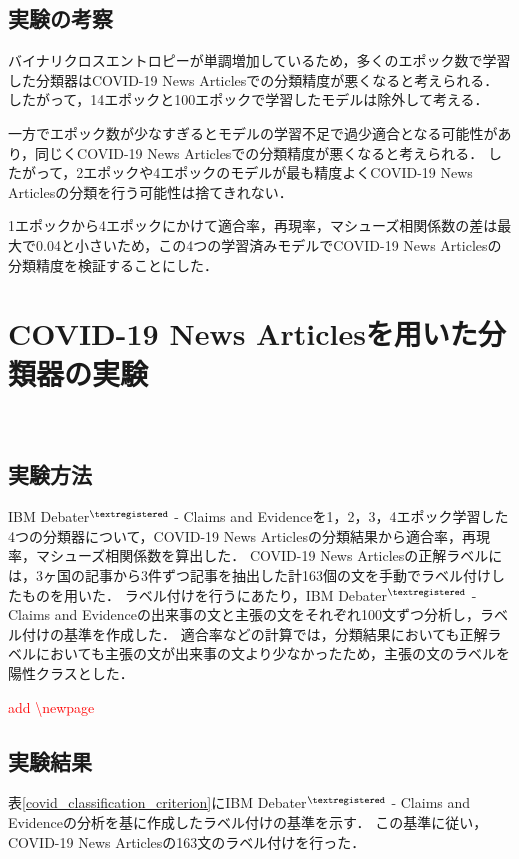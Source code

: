 \documentclass[12pt,a4j]{jreport}
\begin{document}
\subsection{実験の考察}
バイナリクロスエントロピーが単調増加しているため，多くのエポック数で学習した分類器はCOVID-19 News Articlesでの分類精度が悪くなると考えられる．
したがって，14エポックと100エポックで学習したモデルは除外して考える．

一方でエポック数が少なすぎるとモデルの学習不足で過少適合となる可能性があり，同じくCOVID-19 News Articlesでの分類精度が悪くなると考えられる．
したがって，2エポックや4エポックのモデルが最も精度よくCOVID-19 News Articlesの分類を行う可能性は捨てきれない．

1エポックから4エポックにかけて適合率，再現率，マシューズ相関係数の差は最大で0.04と小さいため，この4つの学習済みモデルでCOVID-19 News Articlesの分類精度を検証することにした．

\section{COVID-19 News Articlesを用いた分類器の実験}
\label{section_covid_classification_experiment}
~

\subsection{実験方法}
IBM Debater$^{\textregistered}$ - Claims and Evidenceを1，2，3，4エポック学習した4つの分類器について，COVID-19 News Articlesの分類結果から適合率，再現率，マシューズ相関係数を算出した．
COVID-19 News Articlesの正解ラベルには，3ヶ国の記事から3件ずつ記事を抽出した計163個の文を手動でラベル付けしたものを用いた．
ラベル付けを行うにあたり，IBM Debater$^{\textregistered}$ - Claims and Evidenceの出来事の文と主張の文をそれぞれ100文ずつ分析し，ラベル付けの基準を作成した．
適合率などの計算では，分類結果においても正解ラベルにおいても主張の文が出来事の文より少なかったため，主張の文のラベルを陽性クラスとした．


\textcolor{red}{add \textbackslash newpage}
\newpage

\subsection{実験結果}
表\ref{covid_classification_criterion}にIBM Debater$^{\textregistered}$ - Claims and Evidenceの分析を基に作成したラベル付けの基準を示す．
この基準に従い，COVID-19 News Articlesの163文のラベル付けを行った．
\end{document}
